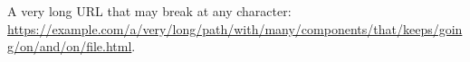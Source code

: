 \documentclass{article}
\begin{document}
A very long URL that may break at any character:
\url{https://example.com/a/very/long/path/with/many/components/that/keeps/going/on/and/on/file.html}.
\end{document}
